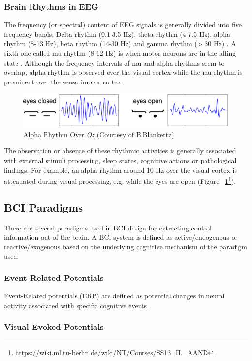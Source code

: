 \documentclass[12pt]{article}
\newcommand\mysubsection[1]{\subsection{#1}}
\newcommand\mysubsubsection[1]{\subsubsection{#1}}
\numberwithin{equation}{section}
\numberwithin{figure}{section}
\numberwithin{table}{section}
\begin{document}
\mysubsubsection{Brain Rhythms in EEG}
\par{
    The frequency (or spectral) content of EEG signals is generally divided into five frequency
    bands: Delta rhythm (0.1-3.5 Hz), theta rhythm (4-7.5 Hz), alpha rhythm (8-13 Hz),
    beta rhythm (14-30 Hz) and gamma rhythm (> 30 Hz) \citep{niedermeyer_electroencephalography:_2005}.
    A sixth one called mu rhythm (8-12 Hz) is when motor neurons are in the idling
    state \citep{wang_practical_2010}. Although the frequency intervals of mu and
    alpha rhythms seem to overlap, alpha rhythm is observed over the visual cortex
    while the mu rhythm is prominent over the sensorimotor cortex.
}
    \par{
    \begin{figure}[ht]
        \centering
        \includegraphics[scale=0.8]{images/alpha_eyes}
        \caption[Alpha Rhythm Over Oz]{Alpha Rhythm Over \emph{Oz} (Courtesy of B.Blankertz)}
        \label{fig:eeg_alpha}
    \end{figure}

    The observation or absence of these rhythmic activities is generally associated
    with external stimuli processing, sleep states, cognitive actions or pathological
    findings. For example, an alpha rhythm around 10 Hz over the visual cortex
    is attenuated during visual processing, e.g. while the eyes are open (Figure ~\ref{fig:eeg_alpha}\footnote{\url{https://wiki.ml.tu-berlin.de/wiki/NT/Courses/SS13_IL_AAND}}).
}

\mysubsection{BCI Paradigms}
\par{
    There are several paradigms used in BCI design for extracting control information
    out of the brain. A BCI system is defined as active/endogenous or
    reactive/exogenous based on the underlying cognitive mechanism of the paradigm used.
}
\mysubsubsection{Event-Related Potentials}
\par{
    Event-Related potentials (ERP) are defined as potential changes in
    neural activity associated with specific cognitive events \citep{luck_introduction_2005}.
}
\mysubsubsection{Visual Evoked Potentials}
\par{
}
\end{document}
